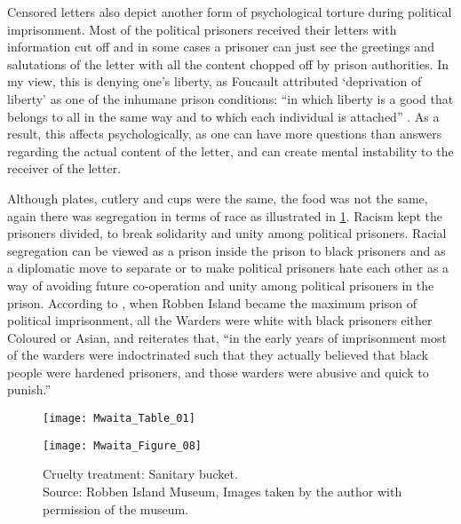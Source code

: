 Censored letters also depict another form of psychological torture during political imprisonment. Most of the political prisoners received their letters with information cut off and in some cases a prisoner can just see the greetings and salutations of the letter with all the content chopped off by prison authorities. In my view, this is denying one’s liberty, as Foucault attributed ‘deprivation of liberty’ as one of the inhumane prison conditions: “in which liberty is a good that belongs to all in the same way and to which each individual is attached” \parencite[232]{Foucault_1995}. As a result, this affects psychologically, as one can have more questions than answers regarding the actual content of the letter, and can create mental instability to the receiver of the letter.

Although plates, cutlery and cups were the same, the food was not the same, again there was segregation in terms of race as illustrated in \cref{fig:Mwaita_Table_01}. Racism kept the prisoners divided, to break solidarity and unity among political prisoners. Racial segregation can be viewed as a prison inside the prison to black prisoners and as a diplomatic move to separate or to make political prisoners hate each other as a way of avoiding future co-operation and unity among political prisoners in the prison. According to \parencite[47]{Hutton_1997}, when Robben Island became the maximum prison of political imprisonment, all the Warders were white with black prisoners either Coloured or Asian, and \textcite[131]{Alexander_1994} reiterates that, “in the early years of imprisonment most of the warders were indoctrinated such that they actually believed that black people were hardened prisoners, and those warders were abusive and quick to punish.”

\begin{figure}[!p]
	\texttt{[image: Mwaita\_Table\_01]}
	\label{fig:Mwaita_Table_01}
\end{figure}

\begin{figure}[!p]
	\texttt{[image: Mwaita\_Figure\_08]}
	\caption{Cruelty treatment: Sanitary bucket.
  {\normalfont\scriptsize \\   Source: Robben Island Museum, Images taken by the author with permission of the museum.
                    }}
	\label{fig:Mwaita_Figure_08}
\end{figure}

